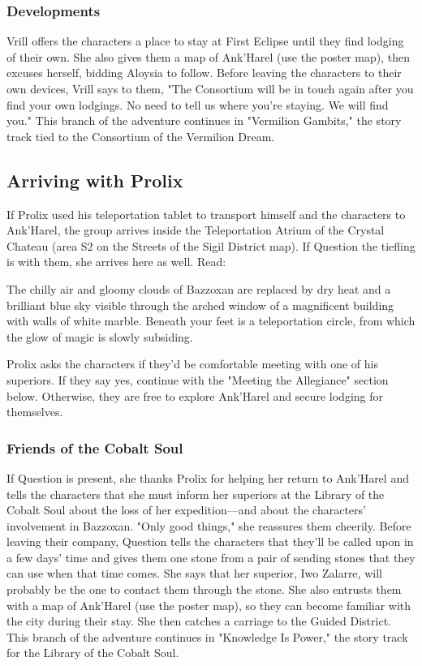 \documentclass[10pt,a4,twoside,twocolumn,openany,nodeprecatedcode]{dndbook}
\begin{document}
\subsubsection{Developments}
Vrill offers the characters a place to stay at First Eclipse until they find lodging of their own. She also gives them a map of Ank'Harel (use the poster map), then excuses herself, bidding Aloysia to follow. Before leaving the characters to their own devices, Vrill says to them, "The Consortium will be in touch again after you find your own lodgings. No need to tell us where you're staying. We will find you."
This branch of the adventure continues in "Vermilion Gambits," the story track tied to the Consortium of the Vermilion Dream.
\subsection{Arriving with Prolix}
If Prolix used his teleportation tablet to transport himself and the characters to Ank'Harel, the group arrives inside the Teleportation Atrium of the Crystal Chateau (area S2 on the Streets of the Sigil District map). If Question the tiefling is with them, she arrives here as well. Read:
\begin{DndReadAloud}{}
The chilly air and gloomy clouds of Bazzoxan are replaced by dry heat and a brilliant blue sky visible through the arched window of a magnificent building with walls of white marble. Beneath your feet is a teleportation circle, from which the glow of magic is slowly subsiding.
\end{DndReadAloud}

Prolix asks the characters if they'd be comfortable meeting with one of his superiors. If they say yes, continue with the "Meeting the Allegiance" section below. Otherwise, they are free to explore Ank'Harel and secure lodging for themselves.
\subsubsection{Friends of the Cobalt Soul}
If Question is present, she thanks Prolix for helping her return to Ank'Harel and tells the characters that she must inform her superiors at the Library of the Cobalt Soul about the loss of her expedition—and about the characters' involvement in Bazzoxan. "Only good things," she reassures them cheerily.
Before leaving their company, Question tells the characters that they'll be called upon in a few days' time and gives them one stone from a pair of sending stones that they can use when that time comes. She says that her superior, Iwo Zalarre, will probably be the one to contact them through the stone. She also entrusts them with a map of Ank'Harel (use the poster map), so they can become familiar with the city during their stay. She then catches a carriage to the Guided District. This branch of the adventure continues in "Knowledge Is Power," the story track for the Library of the Cobalt Soul.
\end{document}
